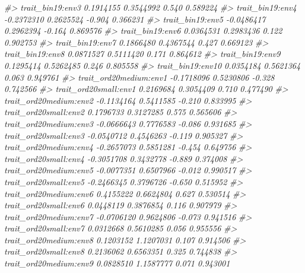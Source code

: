 \documentclass[
]{article}
\newenvironment{Shaded}{\begin{snugshade}}{\end{snugshade}}
\newcommand{\CommentTok}[1]{\textcolor[rgb]{0.56,0.35,0.01}{\textit{#1}}}
\begin{document}
\begin{Shaded}
\begin{Highlighting}[]
\CommentTok{\#\textgreater{} trait\_bin19:env3               0.1914155  0.3544992   0.540 0.589224    }
\CommentTok{\#\textgreater{} trait\_bin19:env4              {-}0.2372310  0.2625524  {-}0.904 0.366231    }
\CommentTok{\#\textgreater{} trait\_bin19:env5              {-}0.0486417  0.2962394  {-}0.164 0.869576    }
\CommentTok{\#\textgreater{} trait\_bin19:env6               0.0364531  0.2983436   0.122 0.902753    }
\CommentTok{\#\textgreater{} trait\_bin19:env7               0.1866480  0.4367544   0.427 0.669123    }
\CommentTok{\#\textgreater{} trait\_bin19:env8               0.0871527  0.5111420   0.171 0.864612    }
\CommentTok{\#\textgreater{} trait\_bin19:env9               0.1295414  0.5262485   0.246 0.805558    }
\CommentTok{\#\textgreater{} trait\_bin19:env10              0.0354184  0.5621364   0.063 0.949761    }
\CommentTok{\#\textgreater{} trait\_ord20medium:env1        {-}0.1718096  0.5230806  {-}0.328 0.742566    }
\CommentTok{\#\textgreater{} trait\_ord20small:env1          0.2169684  0.3054409   0.710 0.477490    }
\CommentTok{\#\textgreater{} trait\_ord20medium:env2        {-}0.1134164  0.5411585  {-}0.210 0.833995    }
\CommentTok{\#\textgreater{} trait\_ord20small:env2          0.1796733  0.3127285   0.575 0.565606    }
\CommentTok{\#\textgreater{} trait\_ord20medium:env3        {-}0.0666643  0.7776583  {-}0.086 0.931685    }
\CommentTok{\#\textgreater{} trait\_ord20small:env3         {-}0.0540712  0.4546263  {-}0.119 0.905327    }
\CommentTok{\#\textgreater{} trait\_ord20medium:env4        {-}0.2657073  0.5851281  {-}0.454 0.649756    }
\CommentTok{\#\textgreater{} trait\_ord20small:env4         {-}0.3051708  0.3432778  {-}0.889 0.374008    }
\CommentTok{\#\textgreater{} trait\_ord20medium:env5        {-}0.0077351  0.6507966  {-}0.012 0.990517    }
\CommentTok{\#\textgreater{} trait\_ord20small:env5         {-}0.2466345  0.3796726  {-}0.650 0.515952    }
\CommentTok{\#\textgreater{} trait\_ord20medium:env6         0.4155222  0.6624804   0.627 0.530514    }
\CommentTok{\#\textgreater{} trait\_ord20small:env6          0.0448119  0.3876854   0.116 0.907979    }
\CommentTok{\#\textgreater{} trait\_ord20medium:env7        {-}0.0706120  0.9624806  {-}0.073 0.941516    }
\CommentTok{\#\textgreater{} trait\_ord20small:env7          0.0312668  0.5610285   0.056 0.955556    }
\CommentTok{\#\textgreater{} trait\_ord20medium:env8         0.1203152  1.1207031   0.107 0.914506    }
\CommentTok{\#\textgreater{} trait\_ord20small:env8          0.2136062  0.6563351   0.325 0.744838    }
\CommentTok{\#\textgreater{} trait\_ord20medium:env9         0.0828510  1.1587777   0.071 0.943001    }

\end{Highlighting}
\end{Shaded}
\end{document}
